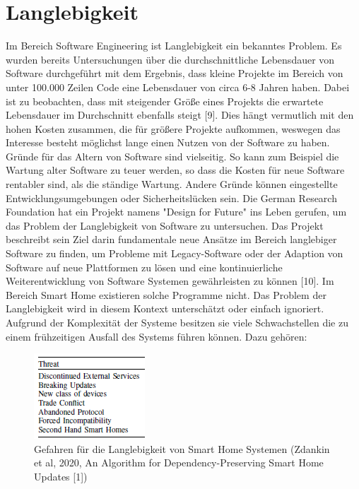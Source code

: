 \section{Langlebigkeit}
Im Bereich Software Engineering ist Langlebigkeit ein bekanntes Problem. Es wurden bereits Untersuchungen über die durchschnittliche 
Lebensdauer von Software durchgeführt mit dem Ergebnis, dass kleine Projekte im Bereich von unter 100.000 Zeilen Code eine Lebensdauer von circa 
6-8 Jahren haben. Dabei ist zu beobachten, dass mit steigender Größe eines Projekts die erwartete Lebensdauer im Durchschnitt
ebenfalls steigt [9]. Dies hängt vermutlich mit den hohen Kosten zusammen, die für größere Projekte aufkommen, weswegen das Interesse besteht
möglichst lange einen Nutzen von der Software zu haben. Gründe für das Altern von Software sind vielseitig. So kann zum Beispiel 
die Wartung alter Software zu teuer werden, so dass die Kosten für neue Software rentabler sind, als die ständige Wartung.
Andere Gründe können eingestellte Entwicklungsumgebungen oder Sicherheitslücken
sein. Die German Research Foundation hat ein Projekt namens "Design for Future" ins Leben gerufen, um das Problem der Langlebigkeit
von Software zu untersuchen. Das Projekt beschreibt sein Ziel darin fundamentale neue Ansätze im Bereich langlebiger Software zu finden, um Probleme mit Legacy-Software
oder der Adaption von Software auf neue Plattformen zu lösen und eine kontinuierliche Weiterentwicklung von Software Systemen gewährleisten 
zu können [10].
Im Bereich Smart Home existieren solche Programme nicht. Das Problem der Langlebigkeit wird in diesem Kontext unterschätzt oder einfach ignoriert.
Aufgrund der Komplexität der Systeme besitzen sie viele Schwachstellen die zu einem frühzeitigen Ausfall des Systems führen können. Dazu gehören:

\begin{figure}[h]
\centering
\includegraphics{"images/Threats"}
\caption{Gefahren für die Langlebigkeit von Smart Home Systemen (Zdankin et al, 2020, An Algorithm for Dependency-Preserving Smart Home Updates [1]) }
\label{fig:Prob1:MEA}
\end{figure}

